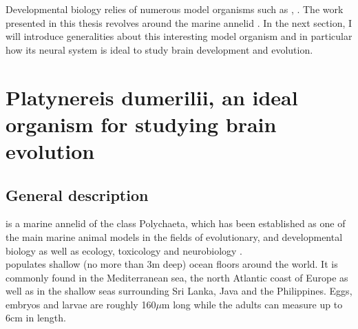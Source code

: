     Developmental biology relies of numerous model organisms such as , . The work presented in this thesis revolves around the marine annelid \platyfull{}. In the next section, I will introduce generalities about this interesting model organism and in particular how its neural system is ideal to study brain development and evolution.
    
    
\section{Platynereis dumerilii, an ideal organism for studying brain evolution}\label{sec:platynereis}
     \subsection{General description}
     \platyfull{} is a marine annelid of the class Polychaeta, which has been established as one of the main marine animal models in the fields of evolutionary, and developmental biology as well as ecology, toxicology and neurobiology \cite{hutchinson95,tessmar03,hardege99,dorresteijn90,fischer04,Fischer10}.\\
     
     \platy{} populates shallow (no more than 3m deep) ocean floors around the world. It is commonly found in the Mediterranean sea, the north Atlantic coast of Europe as well as in the shallow seas surrounding Sri Lanka, Java and the Philippines. Eggs, embryos and larvae are roughly 160$\mu$m long while the adults can measure up to 6cm in length.
     

